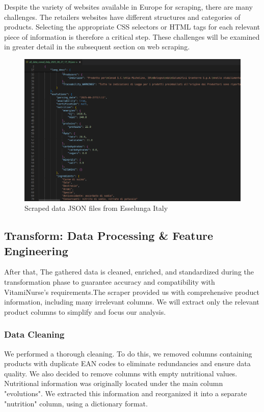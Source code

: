 Despite the variety of websites available in Europe for scraping, there are many challenges. The retailers websites have different structures and categories of products. Selecting the appropriate CSS selectors or HTML tags for each relevant piece of information is therefore a critical step. These challenges will be examined in greater detail in the subsequent section on web scraping.

\begin{center}
\begin{figure}[H]
\includegraphics[scale=0.39]{images/conad_italy_data.png}
\caption{Scraped data JSON files from Esselunga Italy} 
\label{fig:scraped_data}
\end{figure}
\end{center}

\subsection{Transform: Data Processing \& Feature Engineering}
After that, The gathered data is cleaned, enriched, and standardized during the transformation phase to guarantee accuracy and compatibility with VitamiNurse’s requirements.The scraper provided us with comprehensive product information, including many irrelevant columns. We will extract only the relevant product columns to simplify and focus our analysis.


\subsubsection{Data Cleaning}
We performed a thorough cleaning. To do this, we removed columns containing products with duplicate EAN codes to eliminate redundancies and ensure data quality. We also decided to remove columns with empty nutritional values. Nutritional information was originally located under the main column "evolutions". We extracted this information and reorganized it into a separate "nutrition" column, using a dictionary format.

